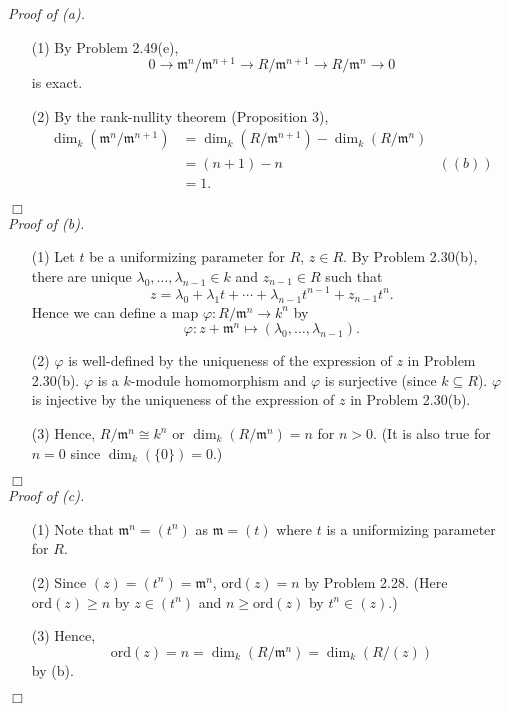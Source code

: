 \documentclass{article}
\begin{document}
\emph{Proof of (a).}
\begin{enumerate}
\item[(1)]
  By Problem 2.49(e),
  \[
    0
    \to \mathfrak{m}^{n}/\mathfrak{m}^{n+1}
    \to R/\mathfrak{m}^{n+1}
    \to R/\mathfrak{m}^{n}
    \to 0
  \]
  is exact.

\item[(2)]
  By the rank-nullity theorem (Proposition 3),
  \begin{align*}
    \dim_k(\mathfrak{m}^{n}/\mathfrak{m}^{n+1})
    &= \dim_k(R/\mathfrak{m}^{n+1}) - \dim_k(R/\mathfrak{m}^{n}) \\
    &= (n+1) - n
      &((b)) \\
    &= 1.
  \end{align*}
\end{enumerate}
$\Box$ \\



\emph{Proof of (b).}
\begin{enumerate}
\item[(1)]
  Let $t$ be a uniformizing parameter for $R$, $z \in R$.
  By Problem 2.30(b), there are unique $\lambda_0, \ldots, \lambda_{n-1} \in k$
  and $z_{n-1} \in R$ such that
  \[
    z = \lambda_0 + \lambda_1 t + \cdots + \lambda_{n-1} t^{n-1} + z_{n-1} t^{n}.
  \]
  Hence we can define a map $\varphi: R/\mathfrak{m}^{n} \to k^n$
  by
  \[
    \varphi: z + \mathfrak{m}^{n} \mapsto (\lambda_0, \ldots, \lambda_{n-1}).
  \]

\item[(2)]
  $\varphi$ is well-defined by the uniqueness of the expression of $z$ in Problem 2.30(b).
  $\varphi$ is a $k$-module homomorphism and $\varphi$ is surjective (since $k \subseteq R$).
  $\varphi$ is injective by the uniqueness of the expression of $z$ in Problem 2.30(b).

\item[(3)]
  Hence, $R/\mathfrak{m}^{n} \cong k^n$ or $\dim_k(R/\mathfrak{m}^{n}) = n$ for $n > 0$.
  (It is also true for $n = 0$ since $\dim_k(\{0\}) = 0$.)
\end{enumerate}
$\Box$ \\



\emph{Proof of (c).}
\begin{enumerate}
\item[(1)]
  Note that $\mathfrak{m}^{n} = (t^n)$ as $\mathfrak{m} = (t)$
  where $t$ is a uniformizing parameter for $R$.

\item[(2)]
  Since $(z) = (t^n) = \mathfrak{m}^{n}$, $\mathrm{ord}(z) = n$ by Problem 2.28.
  (Here $\mathrm{ord}(z) \geq n$ by $z \in (t^n)$
  and $n \geq \mathrm{ord}(z)$ by $t^n \in (z)$.)

\item[(3)]
  Hence,
  \[
    \mathrm{ord}(z) = n = \dim_k(R/\mathfrak{m}^{n}) = \dim_k(R/(z))
  \]
  by (b).
\end{enumerate}
$\Box$ \\\\
\end{document}

